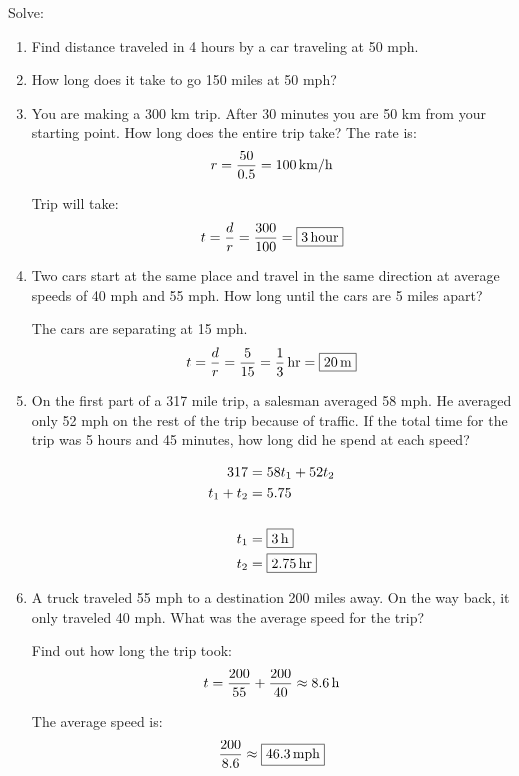 \documentclass[letterpaper, landscape]{exam}
\begin{document}
  Solve:
  \begin{enumerate}
    \item Find distance traveled in 4 hours by a car traveling at 50 mph.

    \item How long does it take to go 150 miles at 50 mph?

    \item You are making a 300 km trip. After 30 minutes you are 50 km from your starting point. How long does the entire trip take?
      The rate is:
      \[
        r = \frac{50}{0.5} = \unit[100]{km/h}
      \]

      Trip will take:
      \[
        t = \frac{d}{r} = \frac{300}{100} = \boxed{ \unit[3]{hour} } 
      \]

    \item Two cars start at the same place and travel in the same direction at average speeds of 40
      mph and 55 mph. How long until the cars are 5 miles apart?

      The cars are separating at 15 mph.
      \[
        t = \frac{d}{r} = \frac{5}{15} = \unit[\frac{1}{3}]{hr} = \boxed{ \unit[20]{m} }
      \]

    \item On the first part of a 317 mile trip, a salesman averaged 58 mph. He averaged only 52 mph
      on the rest of the trip because of traffic. If the total time for the trip was 5 hours and 45
      minutes, how long did he spend at each speed?

      \begin{align*}
        317       & = 58 t_1 + 52 t_2 \\
        t_1 + t_2 & = 5.75 \\
        \\
        t_1       & = \boxed{ \unit[3]{h} } \\
        t_2       & = \boxed{ \unit[2.75]{hr} }
      \end{align*}

    \item A truck traveled 55 mph to a destination 200 miles away. On the way back, it only traveled
      40 mph. What was the average speed for the trip?

      Find out how long the trip took:
      \[
        t = \frac{200}{55} + \frac{200}{40} \approx \unit[8.6]{h}
      \]

      The average speed is:
      \[
        \frac{200}{8.6} \approx \boxed{ \unit[46.3]{mph} }
      \]


\end{enumerate}
\end{document}
